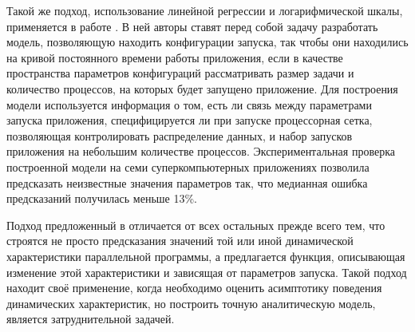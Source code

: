 		Такой же подход, использование линейной регрессии и логарифмической шкалы, применяется в работе \cite{focused_regression}. В ней авторы ставят перед собой задачу разработать модель, позволяющую находить конфигурации запуска, так чтобы они находились на кривой постоянного времени работы приложения, если в качестве пространства параметров конфигураций рассматривать размер задачи и количество процессов, на которых будет запущено приложение. Для построения модели используется информация о том, есть ли связь между параметрами запуска приложения, специфицируется ли при запуске процессорная сетка, позволяющая контролировать распределение данных, и набор запусков приложения на небольшим количестве процессов. Экспериментальная проверка построенной модели на семи суперкомпьютерных приложениях позволила предсказать неизвестные значения параметров так, что медианная ошибка предсказаний получилась меньше 13\%.

		Подход предложенный в \cite{analytic_func} отличается от всех остальных прежде всего тем, что строятся не просто предсказания значений той или иной динамической характеристики параллельной программы, а предлагается функция, описывающая изменение этой характеристики и зависящая от параметров запуска. Такой подход находит своё применение, когда необходимо оценить асимптотику поведения динамических характеристик, но построить точную аналитическую модель, является затруднительной задачей.
			
